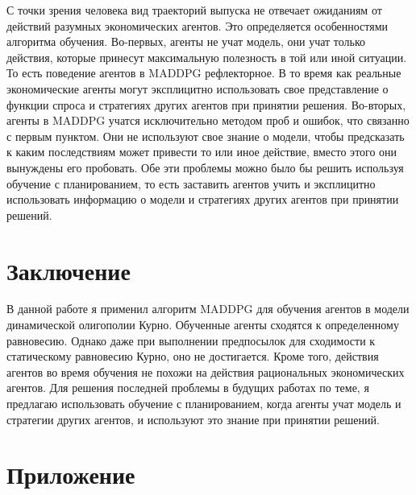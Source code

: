 \documentclass[12pt, a4paper]{extarticle}
\theoremstyle{definition}
\begin{document}
С точки зрения человека вид траекторий выпуска не отвечает ожиданиям от действий разумных экономических агентов. Это определяется особенностями алгоритма обучения. Во-первых, агенты не учат модель, они учат только действия, которые принесут максимальную полезность в той или иной ситуации. То есть поведение агентов в MADDPG рефлекторное. В то время как реальные экономические агенты могут эксплицитно использовать свое представление о функции спроса и стратегиях других агентов при принятии решения. Во-вторых, агенты в MADDPG учатся исключительно методом проб и ошибок, что связанно с первым пунктом. Они не используют свое знание о модели, чтобы предсказать к каким последствиям может привести то или иное действие, вместо этого они вынуждены его пробовать. Обе эти проблемы можно было бы решить используя обучение с планированием, то есть заставить агентов учить и эксплицитно использовать информацию о модели и стратегиях других агентов при принятии решений. 

\newpage
\section{Заключение}
В данной работе я применил алгоритм MADDPG для обучения агентов в модели динамической олигополии Курно. Обученные агенты сходятся к определенному равновесию. Однако даже при выполнении предпосылок для сходимости к статическому равновесию Курно, оно не достигается. Кроме того, действия агентов во время обучения не похожи на действия рациональных экономических агентов. Для решения последней проблемы в будущих работах по теме, я предлагаю использовать обучение с планированием, когда агенты учат модель и стратегии других агентов, и используют это знание при принятии решений. 

\newpage



\section{Приложение} \label{priloj}
\end{document}
